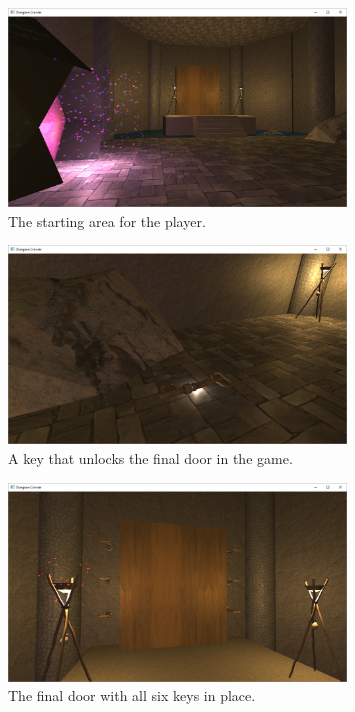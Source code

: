 \documentclass[a4paper, oneside, 11pt]{report}
\begin{document}
\begin{figure}[H]
\centering
\includegraphics[width=0.8\textwidth]{startRoom.PNG}
\caption{The starting area for the player.}
\label{fig:startRoom}
\end{figure}
\begin{figure}[H]
\centering
\includegraphics[width=0.8\textwidth]{keyandlight.PNG}
\caption{A key that unlocks the final door in the game.}
\label{fig:key}
\end{figure}
\begin{figure}[H]
\centering
\includegraphics[width=0.8\textwidth]{doorWithKeys.PNG}
\caption{The final door with all six keys in place.}
\label{fig:door}
\end{figure}
\end{document}
